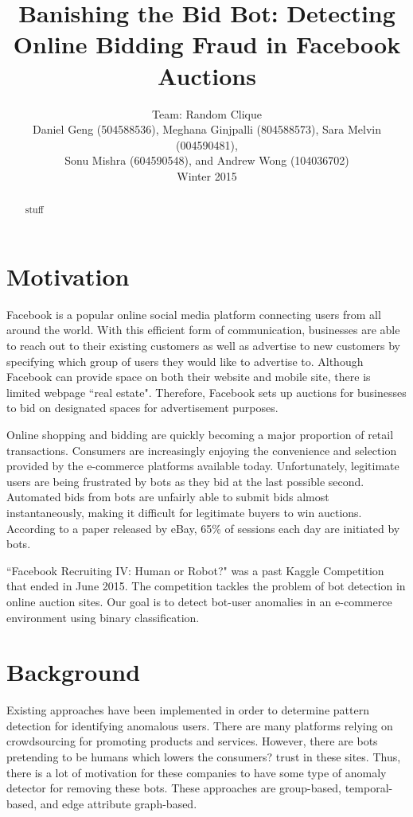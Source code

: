 \documentclass{article} %
\title{Banishing the Bid Bot: Detecting Online Bidding Fraud in Facebook Auctions}
\author{
Team: Random Clique \\
Daniel Geng (504588536), Meghana Ginjpalli (804588573), Sara Melvin (004590481), \\
Sonu Mishra (604590548), and Andrew Wong (104036702) \\
Winter 2015
}
\begin{document}
\maketitle

\begin{abstract}

stuff

\end{abstract}

\section{Motivation}

Facebook is a popular online social media platform connecting users from all around the world.
With this efficient form of communication, businesses are able to reach out to their existing customers as well as advertise to new customers by specifying which group of users they would like to advertise to.
Although Facebook can provide space on both their website and mobile site, there is limited webpage ``real estate".
Therefore, Facebook sets up auctions for businesses to bid on designated spaces for advertisement purposes.

Online shopping and bidding are quickly becoming a major proportion of retail transactions. %
Consumers are increasingly enjoying the convenience and selection provided by the e-commerce platforms available today.
Unfortunately, legitimate users are being frustrated by bots as they bid at the last possible second.
Automated bids from bots are unfairly able to submit bids almost instantaneously, making it difficult for legitimate buyers to win auctions.
According to a paper released by eBay, 65\% of sessions each day are initiated by bots. %

``Facebook Recruiting IV: Human or Robot?" was a past Kaggle Competition that ended in June 2015.
The competition tackles the problem of bot detection in online auction sites.
Our goal is to detect bot-user anomalies in an e-commerce environment using binary classification. 

\section{Background}

Existing approaches have been implemented in order to determine pattern detection for identifying anomalous users.
There are many platforms relying on crowdsourcing for promoting products and services.
However, there are bots pretending to be humans which lowers the consumers? trust in these sites.
Thus, there is a lot of motivation for these companies to have some type of anomaly detector for removing these bots.
These approaches are group-based, temporal-based, and edge attribute graph-based.
\end{document}
